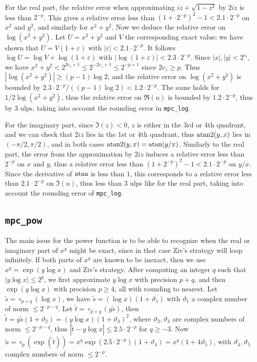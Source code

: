 \documentclass [11pt]{article}
\newcommand {\round}{\operatorname {\circ}}
\renewcommand {\theta}{\vartheta}
\renewcommand {\leq}{\leqslant}
\renewcommand {\geq}{\geqslant}
\begin{document}
For the real part, the relative error when approximating
$iz + \sqrt{1-z^2}$ by $2iz$ is less than $2^{-p}$.
This gives a relative error less than $(1 + \cdot 2^{-p})^2 - 1 < 2.1 \cdot 2^{-p}$
on $x^2$ and $y^2$, and similarly for $x^2+y^2$.
Now we deduce the relative error on $\log(x^2+y^2)$.
Let $U = x^2+y^2$ and $V$ the corresponding exact value;
we have shown that $U = V (1 + \varepsilon)$ with
$|\varepsilon| < 2.1 \cdot 2^{-p}$.
It follows $\log U = \log V + \log(1 + \varepsilon)$
with $|\log(1 + \varepsilon)| < 2.3 \cdot 2^{-p}$.
Since $|x|, |y| < 2^{e_t}$, we have $x^2+y^2 < 2^{2e_t+1} \le 2^{-2e_z+1}
\le 2^{-p+1}$ since $2e_z \ge p$.
Thus $|\log(x^2+y^2)| \ge (p-1) \log 2$,
and the relative error on $\log(x^2+y^2)$ is bounded by
$2.3 \cdot 2^{-p}/((p-1) \log 2) < 1.2 \cdot 2^{-p}$.
The same holds for $1/2 \log(x^2+y^2)$, thus the relative error on $\Re(u)$
is bounded by $1.2 \cdot 2^{-p}$, thus by $3$ ulps, taking into account
the rounding error in \verb|mpc_log|.

For the imaginary part, since $\Im(z) < 0$, $z$ is either in the 3rd or 4th
quadrant, and we can check that $2iz$ lies in the 1st or 4th
quadrant, thus ${\rm atan2}(y,x)$ lies in $(-\pi/2,\pi/2)$, and in both
cases ${\rm atan2}(y,x) = {\rm atan}(y/x)$.
Similarly to the real part, the error from the approximation by $2iz$
induces a relative error less than $2^{-p}$ on $x$ and $y$,
thus a relative error less than $(1 + 2^{-p})^2-1 < 2.1 \cdot 2^{-p}$
on $y/x$.
Since the derivative of $\rm atan$ is less than $1$, this corresponds
to a relative error less than $2.1 \cdot 2^{-p}$ on $\Im(u)$,
thus less than $3$ ulps like for the real part,
taking into account the rounding error of \verb|mpc_log|.


\subsection {\texttt {mpc\_pow}}

The main issue for the power function is to be able to recognize when the
real or imaginary part of $x^y$ might be exact, since in that case
Ziv's strategy will loop infinitely.
If both parts of $x^y$ are known to be inexact, then we use
$x^y = \exp(y \log x)$ and Ziv's strategy.
After computing an integer $q$ such that $|y \log x| \leq 2^q$, we first
approximate $y \log x$ with precision $p + q$, and then
$\exp(y \log x)$ with precision $p \geq 4$, all with rounding
to nearest.
Let $\tilde{s} = \round_{p+q}(\log x)$,
we have $\tilde{s} = (\log x) (1 + \theta_1)$
with $\theta_1$ a complex number of norm $\leq 2^{-p-q}$.
Let $\tilde{t} = \round_{p+q}(y \tilde{s})$, then
$\tilde{t} = y \tilde{s} (1 + \theta_2) = (y \log x) (1 + \theta_3)^2$,
where $\theta_2, \theta_3$ are complex numbers of norm $\leq 2^{-p-q}$,
thus $|\tilde{t} - y \log x| \leq 2.5 \cdot 2^{-p}$ for $q \geq -3$.
Now $\tilde{u} = \round_p(\exp(\tilde{t})) =
x^y \exp(2.5 \cdot 2^{-p}) (1 + \theta_4) = x^y (1 + 4 \theta_5)$,
with $\theta_4, \theta_5$ complex numbers of norm $\leq 2^{-p}$.
\end{document}
